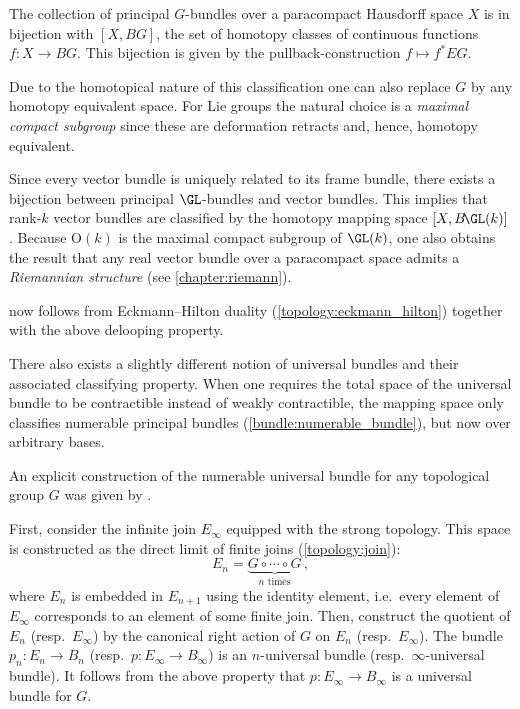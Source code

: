     \begin{property}[Classification]\label{bundle:classification}
        The collection of principal $G$-bundles over a paracompact Hausdorff space $X$ is in bijection with $[X,BG]$, the set of homotopy classes of continuous functions $f:X\rightarrow BG$. This bijection is given by the pullback-construction $f\mapsto f^*EG$.

        Due to the homotopical nature of this classification one can also replace $G$ by any homotopy equivalent space. For Lie groups the natural choice is a \textit{maximal compact subgroup} since these are deformation retracts and, hence, homotopy equivalent.
    \end{property}
    \begin{result}
        Since every vector bundle is uniquely related to its frame bundle, there exists a bijection between principal $\GL$-bundles and vector bundles. This implies that rank-$k$ vector bundles are classified by the homotopy mapping space $[X,B\!\GL(k)]$. Because $\mathrm{O}(k)$ is the maximal compact subgroup of $\GL(k)$, one also obtains the result that any real vector bundle over a paracompact space admits a \textit{Riemannian structure} (see \cref{chapter:riemann}).

         now follows from Eckmann--Hilton duality (\cref{topology:eckmann_hilton}) together with the above delooping property.
    \end{result}
    \begin{remark}
        There also exists a slightly different notion of universal bundles and their associated classifying property. When one requires the total space of the universal bundle to be contractible instead of weakly contractible, the mapping space only classifies numerable principal bundles (\cref{bundle:numerable_bundle}), but now over arbitrary bases.
    \end{remark}

    An explicit construction of the numerable universal bundle for any topological group $G$ was given by .
    \begin{construct}
        First, consider the infinite join $E_\infty$ equipped with the strong topology. This space is constructed as the direct limit of finite joins (\cref{topology:join}): \[E_n=\underbrace{G\circ\cdots\circ G}_{n\text{ times}}\,,\] where $E_n$ is embedded in $E_{n+1}$ using the identity element, i.e.~every element of $E_\infty$ corresponds to an element of some finite join. Then, construct the quotient of $E_n$ (resp.~$E_\infty$) by the canonical right action of $G$ on $E_n$ (resp.~$E_\infty$). The bundle $p_n:E_n\rightarrow B_n$ (resp.~$p:E_\infty\rightarrow B_\infty$) is an $n$-universal bundle (resp.~$\infty$-universal bundle). It follows from the above property that $p:E_\infty\rightarrow B_\infty$ is a universal bundle for $G$.
    \end{construct}

